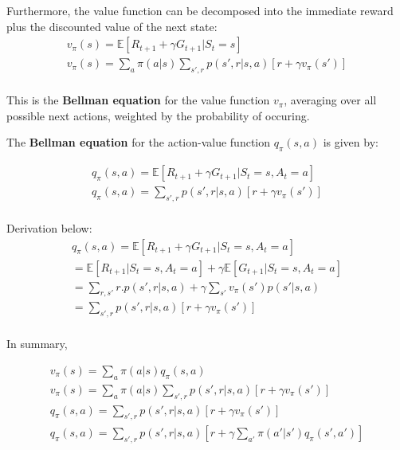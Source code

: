  Furthermore, the value function can be decomposed into the immediate reward plus the discounted value of the next state:
 \begin{equation}
    \begin{split}
        v_\pi(s) = \mathbb{E}[R_{t+1} + \gamma G_{t+1} | S_t = s] \\
        v_\pi(s) = \sum_{a} \pi(a|s) \sum_{s',r} p(s',r|s, a) [r + \gamma v_\pi(s')] \\
        \label{eq:mdp-bellman-equation-2}
    \end{split}
 \end{equation}

 This is the \textbf{Bellman equation} for the value function $v_\pi$, averaging over all possible next actions, weighted
 by the probability of occuring.

The \textbf{Bellman equation} for the action-value function $q_\pi(s, a)$ is given by:

  \begin{equation}
    \begin{split}
       q_\pi(s, a) = \mathbb{E}[R_{t+1} + \gamma G_{t+1} | S_t = s, A_t = a] \\
       q_\pi(s, a) = \sum_{s',r} p(s',r|s, a) [r + \gamma v_\pi(s')] \\
       \label{eq:mdp-bellman-equation-3}
    \end{split}
 \end{equation}

 Derivation below:
 \begin{equation}
    \begin{split}
        q_\pi(s, a) = \mathbb{E}[R_{t+1} + \gamma G_{t+1} | S_t = s, A_t = a] \\
        = \mathbb{E}[R_{t+1} | S_t = s, A_t = a]  + \gamma \mathbb{E}[G_{t+1} | S_t = s, A_t = a] \\
        = \sum_{r,s'} r . p(s',r|s, a) + \gamma \sum_{s'} v_\pi(s') p(s'|s, a) \\
        = \sum_{s',r} p(s',r|s, a) [r + \gamma v_\pi(s')] \\
        \label{eq:mdp-bellman-equation-4}
    \end{split}
 \end{equation}

 In summary,

 \begin{equation}
    \begin{split}
        v_\pi(s) = \sum_{a} \pi(a|s) q_\pi(s, a) \\
        v_\pi(s) = \sum_{a} \pi(a|s) \sum_{s',r} p(s',r|s, a) [r + \gamma v_\pi(s')] \\
        q_\pi(s, a) = \sum_{s',r} p(s',r|s, a) [r + \gamma v_\pi(s')] \\
        q_\pi(s, a) = \sum_{s',r} p(s',r|s, a) [r + \gamma \sum_{a'} \pi(a'|s') q_\pi(s', a')] \\
        \label{eq:mdp-bellman-equation-5}
    \end{split}
 \end{equation}
